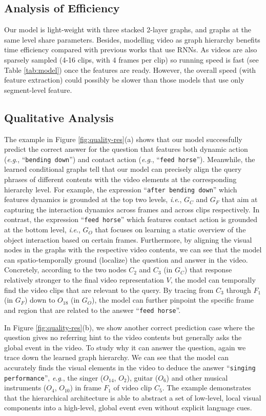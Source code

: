 \documentclass[letterpaper]{article} \usepackage{aaai21}  \usepackage{times}  \usepackage{helvet} \usepackage{courier}  \usepackage[hyphens]{url}  \usepackage{graphicx} \urlstyle{rm} \def\UrlFont{\rm}  \usepackage{natbib}  \usepackage{caption} \usepackage{color, colortbl}
\newcommand{\ie}{\textit{i}.\textit{e}.}
\newcommand{\eg}{\textit{e}.\textit{g}.}
\begin{document}
\subsection{Analysis of Efficiency}
Our model is light-weight with three stacked 2-layer graphs, and graphs at the same level share parameters. Besides, modelling video as graph hierarchy benefits time efficiency compared with previous works that use RNNs. As videos are also sparsely sampled (4-16 clips, with 4 frames per clip) so running speed is fast (see Table \ref{tab:model}) once the features are ready. However, the overall speed (with feature extraction) could possibly be slower than those models that use only segment-level feature.



\subsection{Qualitative Analysis}


The example in Figure \ref{fig:quality-res}(a) shows that our model successfully predict the correct answer for the question that features both dynamic action (\eg, ``\texttt{bending down}'') and contact action (\eg, ``\texttt{feed horse}''). Meanwhile, the learned conditional graphs tell that our model can precisely align the query phrases of different contents with the video elements at the corresponding hierarchy level. For example, the expression ``\texttt{after bending down}'' which features dynamics is grounded at the top two levels, \ie, $G_C$ and $G_F$ that aim at capturing the interaction dynamics across frames and across clips respectively. In contrast, the expression ``\texttt{feed horse}'' which features contact action is grounded at the bottom level, \ie, $G_O$ that focuses on learning a static overview of the object interaction based on certain frames. Furthermore, by aligning the visual nodes in the graphs with the respective video contents, we can see that the model can spatio-temporally ground (localize) the question and answer in the video. Concretely, according to the two nodes $C_2$ and $C_3$ (in $G_C$) that response relatively stronger to the final video representation $V$, the model can temporally find the video clips that are relevant to the query. By tracing from $C_3$ through $F_1$ (in $G_F$) down to $O_{18}$ (in $G_O$), the model can further pinpoint the specific frame and region that are related to the answer ``\texttt{feed horse}''.

In Figure \ref{fig:quality-res}(b), we show another correct prediction case where the question gives no referring hint to the video contents but generally asks the global event in the video. To study why it can answer the question, again we trace down the learned graph hierarchy. We can see that the model can accurately finds the visual elements in the video to deduce the answer ``\texttt{singing performance}'', \eg, the singer ($O_{14}$, $O_2$), guitar ($O_6$) and other musical instruments ($O_4$, $O_{10}$) in frame $F_1$ of video clip $C_5$. The example demonstrates that the hierarchical architecture is able to abstract a set of low-level, local visual components into a high-level, global event even without explicit language cues.
\end{document}
